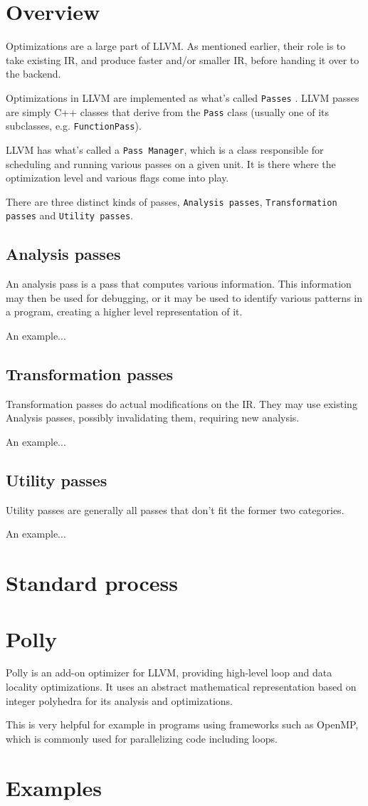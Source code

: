 \section{Overview}
Optimizations are a large part of LLVM. As mentioned earlier, their role is to take existing IR, and produce faster and/or smaller IR, before handing it over to the backend.

Optimizations in LLVM are implemented as what's called \texttt{Passes} \cite{llvm_passes}. LLVM passes are simply C++ classes that derive from the \texttt{Pass} class (usually one of its subclasses, e.g. \texttt{FunctionPass}).

LLVM has what's called a \texttt{Pass Manager}, which is a class responsible for scheduling and running various passes on a given unit. It is there where the optimization level and various flags come into play.

There are three distinct kinds of passes, \texttt{Analysis passes}, \texttt{Transformation passes} and \texttt{Utility passes}.

\subsection{Analysis passes}
An analysis pass is a pass that computes various information. This information may then be used for debugging, or it may be used to identify various patterns in a program, creating a higher level representation of it.

An example...

\subsection{Transformation passes}
Transformation passes do actual modifications on the IR. They may use existing Analysis passes, possibly invalidating them, requiring new analysis.

An example...

\subsection{Utility passes}
Utility passes are generally all passes that don't fit the former two categories.

An example...

\section{Standard process}
\section{Polly}
Polly \cite{llvm_polly} is an add-on optimizer for LLVM, providing high-level loop and data locality optimizations. It uses an abstract mathematical representation based on integer polyhedra for its analysis and optimizations.

This is very helpful for example in programs using frameworks such as OpenMP, which is commonly used for parallelizing code including loops.

\section{Examples}